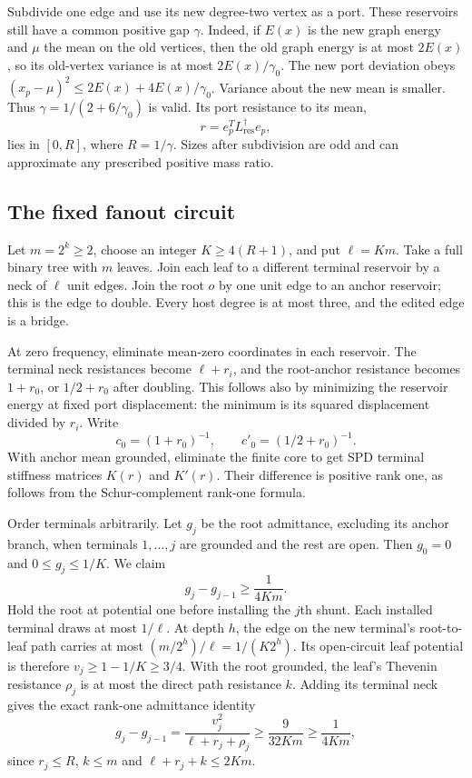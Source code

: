\documentclass[11pt]{article}
\begin{document}
Subdivide one edge and use its new degree-two vertex as a port.
These reservoirs still have a common positive gap $\gamma$.
Indeed, if $E(x)$ is the new graph energy and $\mu$ the mean on the old
vertices, then the old graph energy is at most $2E(x)$, so its old-vertex
variance is at most $2E(x)/\gamma_0$. The new port deviation obeys
$(x_p-\mu)^2\le2E(x)+4E(x)/\gamma_0$.
Variance about the new mean is smaller. Thus
$\gamma=1/(2+6/\gamma_0)$ is valid. Its port resistance to its mean,
\[
 r=e_p^TL_{\mathrm{res}}^\dagger e_p,
\]
lies in $[0,R]$, where $R=1/\gamma$.
Sizes after subdivision are odd and can approximate any prescribed
positive mass ratio.

\subsection{The fixed fanout circuit}
Let $m=2^k\ge2$, choose an integer $K\ge4(R+1)$, and put $\ell=Km$.
Take a full binary tree with $m$ leaves. Join each leaf to a different
terminal reservoir by a neck of $\ell$ unit edges. Join the root $o$
by one unit edge to an anchor reservoir; this is the edge to double.
Every host degree is at most three, and the edited edge is a bridge.

At zero frequency, eliminate mean-zero coordinates in each reservoir.
The terminal neck resistances become $\ell+r_i$, and the root-anchor
resistance becomes $1+r_0$, or $1/2+r_0$ after doubling. This follows
also by minimizing the reservoir energy at fixed port displacement:
the minimum is its squared displacement divided by $r_i$.
Write
\[
 c_0=(1+r_0)^{-1},\qquad c'_0=(1/2+r_0)^{-1}.
\]
With anchor mean grounded, eliminate the finite core to get SPD terminal
stiffness matrices $K(r)$ and $K'(r)$. Their difference is positive
rank one, as follows from the Schur-complement rank-one formula.

Order terminals arbitrarily. Let $g_j$ be the root admittance, excluding
its anchor branch, when terminals $1,\ldots,j$ are grounded and the
rest are open. Then $g_0=0$ and $0\le g_j\le1/K$.
We claim
\begin{equation}\label{eq:gstep}
 g_j-g_{j-1}\ge\frac1{4Km}.
\end{equation}
Hold the root at potential one before installing the $j$th shunt.
Each installed terminal draws at most $1/\ell$. At depth $h$, the edge
on the new terminal's root-to-leaf path carries at most
$(m/2^h)/\ell=1/(K2^h)$. Its open-circuit leaf potential is therefore
$v_j\ge1-1/K\ge3/4$.
With the root grounded, the leaf's Thevenin resistance $\rho_j$ is
at most the direct path resistance $k$. Adding its terminal neck gives
the exact rank-one admittance identity
\[
 g_j-g_{j-1}=\frac{v_j^2}{\ell+r_j+\rho_j}
                 \ge\frac{9}{32Km}\ge\frac1{4Km},
\]
since $r_j\le R$, $k\le m$ and $\ell+r_j+k\le2Km$.
\end{document}
